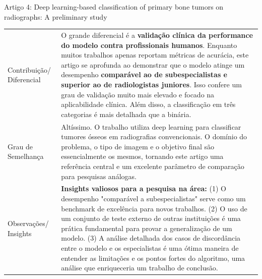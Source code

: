 \documentclass[12pt, a4paper]{article}
\begin{document}
\begin{fichabox}{Artigo 4: Deep learning-based classification of primary bone tumors on radiographs: A preliminary study}
\begin{longtable}{@{} B L{10.5cm} @{}}
    Contribuição/ Diferencial & O grande diferencial é a \textbf{validação clínica da performance do modelo contra profissionais humanos}. Enquanto muitos trabalhos apenas reportam métricas de acurácia, este artigo se aprofunda ao demonstrar que o modelo atinge um desempenho \textbf{comparável ao de subespecialistas e superior ao de radiologistas juniores}. Isso confere um grau de validação muito mais elevado e focado na aplicabilidade clínica. Além disso, a classificação em três categorias é mais detalhada que a binária. \\
    \addlinespace
    
    Grau de Semelhança & Altíssimo. O trabalho utiliza deep learning para classificar tumores ósseos em radiografias convencionais. O domínio do problema, o tipo de imagem e o objetivo final são essencialmente os mesmos, tornando este artigo uma referência central e um excelente parâmetro de comparação para pesquisas análogas. \\
    \addlinespace
    
    Observações/ Insights & \textbf{Insights valiosos para a pesquisa na área:} (1) O desempenho "comparável a subespecialistas" serve como um benchmark de excelência para novos trabalhos. (2) O uso de um conjunto de teste externo de outras instituições é uma prática fundamental para provar a generalização de um modelo. (3) A análise detalhada dos casos de discordância entre o modelo e os especialistas é uma ótima maneira de entender as limitações e os pontos fortes do algoritmo, uma análise que enriqueceria um trabalho de conclusão. \\
    
    \bottomrule
\end{longtable}
\end{fichabox}
\end{document}
